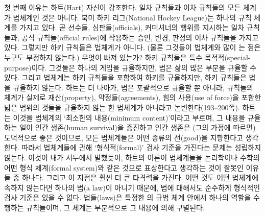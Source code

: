 첫 번째 이유는 하트(Hart) 자신이 강조한다. 일차 규칙들과 이차 규칙들의
모든 체계가 법체계인 것은 아니다. 북미 하키 리그(National Hockey
League)는 하나의 규칙 체계를 가지고 있다. 곧 선수들, 심판들(officials),
커미셔너의 행위를 지시하는 일차 규칙들과, 공식 규칙들(official rules)에
작용하는 승인, 변경, 판정의 이차 규칙들을 가지고 있다. 그렇지만 하키
규칙들은 법체계가 아니다. (물론 그것들이 법체계와 많이 는 점은 누구도 부정하지 않는다.) 무엇이 빠져 있는가? 하키 규칙들은
특수 목적적(special-purpose)이다. 그것들은 하나의 게임을 규율하지만,
법은 삶의 많은 부분을 규율할 수 있다. 그리고 법체계는 하키 규칙들을
포함하여 하키를 규율하지만, 하키 규칙들은 법을 규율하지 않는다. 하트는
더 나아가, 법은 포괄적으로 규율할  뿐 아니라, 규칙들의
체계가 실제로 재산(property), 약정들(agreements), 힘의 사용(use of
force)을 포함한 넓은 범위의 것들을 규율하지 않는 한 법체계가 아니라고
논변한다(193--200쪽). 하트는 이것을 법체계의 ‘최소한의 내용(minimum
content)’이라고 부르며, 그 내용을 규율하는 일이 인간 생존(human
survival)을 증진하고 인간 생존은 (그의 가정에 따르면) 도덕적으로 좋은
것이므로, 모든 법체계들은 어떤 종류의 선(good)을 지향한다고 생각한다.
따라서 법체계들에 관해 ‘형식적(formal)’ 검사 기준을 가진다는 문제는
성립하지 않는다. 이것이 내가 서두에서 말했듯이, 하트의 이론이 법체계들을
논리학이나 수학의 어떤 형식 체계(formal system)와 같은 것으로 표상한다고
생각하는 것이 잘못인 이유들 중 하나다. 그리고 이 지점은 훨씬 더 큰
타격력을 가진다. 어떤 것도 어떤 법체계에 속하지 않는다면 하나의 법(a
law)이 아니기 때문에, 법에 대해서도 순수하게 형식적인 검사 기준은 있을
수 없다. 법들(laws)은 특정한 의 규범 체계 안에서 하나의
역할을 수행하는 규칙들이며, 그 체계는 부분적으로 그 내용에 의해
구별된다.

